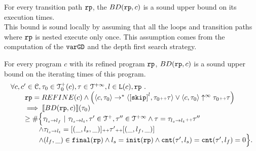 For every transition path $\mathtt{rp}$, the $BD(\mathtt{rp}, c)$
is a sound upper bound on its execution times.
\\
This bound is sound locally by assuming
that all the loops and transition paths where $\mathtt{rp}$ is nested execute only once.
This assumption comes from the computation of the $\mathtt{varGD}$ and the depth first search strategy.
\\
%
\begin{lemma}
    For every program $c$ with its refined program $\mathtt{rp}$,
    $BD(\mathtt{rp}, c)$ is a sound upper bound on the iterating times of this program.
    \[
      \begin{array}{l}
      \forall c, c' \in \cdom, \trace_0 \in \ftdom_0(c), \trace \in \tdom, l \in \lvar(c), \rprog \st 
      \\ \qquad
      \rprog = REFINE(c)
      \land 
      \Big(
        \config{c, \trace_0} \to^* \config{\clabel{\eskip}^{l}, \trace_0 \tracecat \trace}
        \lor \config{c, \trace_0} \uparrow^{\infty} \trace_0 \tracecat \trace 
        \Big)
      \\ \qquad
      \implies
      \econfig{BD(\rprog, c)}(\trace_0) 
      \\ \qquad \geq 
      \# \Big\{\trace_{l_s \to l_f} ~\vert~ \trace_{l_s \to l_t}, \trace'\in \ftdom, \trace'' \in \tdom
      \land \trace = \trace_{l_s \to l_t} \tracecat \trace''
      \\ \qquad \qquad
      \land \trace_{l_s \to l_t} = [(\_, l_s, \_)] \tracecat \trace' \tracecat [(\_, l_f, \_)]
      \\ \qquad \qquad
      \land (l_{f}, \_) \in \absfinal(\rprog)
      \land l_s = \absinit(\rprog)
      \land \counter(\trace', l_s) = \counter(\trace', l_f) = 0 
      \Big\}.
      \end{array}
    \]
    \end{lemma}

